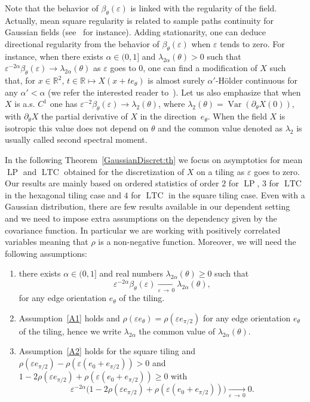 \documentclass[AHL,Unicode,longabstracts,published]{cedram}
\newcommand{\R}{\mathbb{R}}
\newcommand{\eps}{\varepsilon}
\DeclareMathOperator{\LTC}{LTC}
\DeclareMathOperator{\LP}{LP}
\DeclareMathOperator{\Var}{Var}
\newcommand*{\Aenumi}{\renewcommand*{\theenumi}{\bf{A}\arabic{enumi}}}
\begin{document}
Note that the behavior of $\beta_\theta(\eps)$ is linked with the regularity of the field. Actually, mean square regularity is related to sample paths continuity for Gaussian fields (see~\cite{AdlerTaylorBook} for instance). Adding stationarity, one can deduce directional regularity from the behavior of $\beta_\theta(\eps)$ when $\eps$ tends to zero. For instance, when there exists $\alpha \in (0,1]$ and $\lambda_{2\alpha}(\theta)>0$ such that $\eps^{-2\alpha}\beta_\theta(\eps) \rightarrow
\lambda_{2\alpha}(\theta)$ as $\eps$ goes to $0$, one can find a modification of $X$ such that, for $x\in\R^2$, $t\in \R \mapsto X(x+t e_\theta)$ is almost surely $\alpha'$-H\"older continuous for any $\alpha'<\alpha$ (we refer the interested reader to~\cite[Part~2]{BGeosto}). Let us also emphasize that when $X$ is a.s. $C^1$ one has $\eps^{-2}\beta_\theta(\eps) \rightarrow \lambda_{2}(\theta)$, where $\lambda_{2}(\theta)=\Var(\partial_\theta X(0))$, with $\partial_\theta X $ the partial derivative of $X$ in the direction~$e_\theta$. When the field $X$ is isotropic this value does not depend on $\theta$ and the common value denoted as $\lambda_2$ is usually called second spectral moment.



In the following Theorem~\ref{GaussianDiscret:th} we focus on asymptotics for mean $\LP$ and $\LTC$ obtained for the discretization of $X$ on a tiling as $\eps$ goes to zero. Our results are mainly based on ordered statistics of order $2$ for $\LP$, $3$ for $\LTC$ in the hexagonal tiling case and $4$ for $\LTC$ in the square tiling case. Even with a Gaussian distribution, there are few results available in our dependent setting and we need to impose extra assumptions on the dependency given by the covariance function. In particular we are working with positively correlated variables meaning that $\rho$ is a non-negative function. Moreover, we will need the following assumptions:
\begin{enumerate}\Aenumi
\item \label{A1} there exists $\alpha\in (0,1]$ and real numbers $\lambda_{{2\alpha}}(\theta)\geq 0$ such that
\[
\eps^{-2\alpha}\beta_\theta(\eps)\underset{\eps\,\rightarrow\,0}{\longrightarrow} {\lambda_{{2\alpha}}(\theta)},
\]
for any edge orientation $e_\theta$ of the tiling.
\item \label{A2}Assumption~\eqref{A1} holds and $\rho(\eps e_\theta)=\rho(\eps e_{\pi/2})$ for any edge orientation $e_\theta$ of the tiling, hence we write $\lambda_{{2\alpha}}$ the common value of $\lambda_{{2\alpha}}(\theta)$.
\item \label{A3}Assumption~\eqref{A2} holds for the square tiling and $\rho(\eps e_{\pi/2})-\rho(\eps (e_0+e_{\pi/2}))> 0$ and $1-2\rho(\eps e_{\pi/2})+\rho(\eps (e_0+e_{\pi/2}))\ge 0$ with
\[
\eps^{-2\alpha}\big(1-2\rho(\eps e_{\pi/2})+\rho(\eps
(e_0+e_{\pi/2}))\big) \underset{\eps\,\rightarrow\,0}{\longrightarrow} 0.
\]
\end{enumerate}
\end{document}
